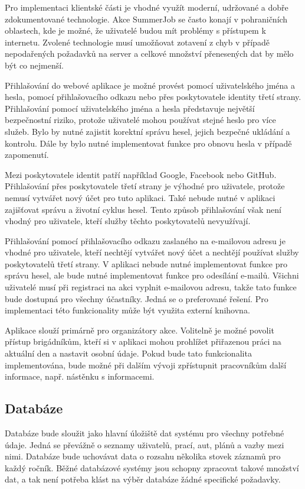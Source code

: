 Pro implementaci klientské části je vhodné využít moderní, udržované a dobře zdokumentované technologie. Akce SummerJob se často konají v pohraničních oblastech,
kde je možné, že uživatelé budou mít problémy s přístupem k internetu. Zvolené technologie musí umožňovat zotavení z chyb v případě nepodařených požadavků na server
a celkové množství přenesených dat by mělo být co nejmenší.

Přihlašování do webové aplikace je možné provést pomocí uživatelského jména a hesla, pomocí přihlašovacího odkazu nebo přes poskytovatele identity třetí strany.
Přihlašování pomocí uživatelského jména a hesla představuje největší bezpečnostní riziko, protože uživatelé mohou používat stejné heslo pro více služeb. Bylo by nutné
zajistit korektní správu hesel, jejich bezpečné ukládání a kontrolu. Dále by bylo nutné implementovat funkce pro obnovu hesla v případě zapomenutí.

Mezi poskytovatele identit patří například Google, Facebook nebo GitHub. Přihlašování přes poskytovatele třetí strany je výhodné pro uživatele, protože nemusí vytvářet
nový účet pro tuto aplikaci. Také nebude nutné v aplikaci zajišťovat správu a životní cyklus hesel. Tento způsob přihlašování však není vhodný pro uživatele,
kteří služby těchto poskytovatelů nevyužívají.

Přihlašování pomocí přihlašovacího odkazu zaslaného na e-mailovou adresu je vhodné pro uživatele, kteří nechtějí vytvářet nový účet a nechtějí používat služby poskytovatelů třetí strany.
V aplikaci nebude nutné implementovat funkce pro správu hesel, ale bude nutné implementovat funkce pro odesílání e-mailů. Všichni uživatelé musí při registraci na akci
vyplnit e-mailovou adresu, takže tato funkce bude dostupná pro všechny účastníky. Jedná se o preferované řešení. Pro implementaci této funkcionality může být využita
externí knihovna.

Aplikace slouží primárně pro organizátory akce. Volitelně je možné povolit přístup brigádníkům, kteří si v aplikaci mohou prohlížet přiřazenou práci na aktuální den a nastavit osobní údaje.
Pokud bude tato funkcionalita implementována, bude možné při dalším vývoji zpřístupnit pracovníkům další informace, např. nástěnku s informacemi.

\subsection{Databáze}

Databáze bude sloužit jako hlavní úložiště dat systému pro všechny potřebné údaje. Jedná se převážně o seznamy uživatelů, prací, aut, plánů a vazby mezi nimi.
Databáze bude uchovávat data o rozsahu několika stovek záznamů pro každý ročník. Běžné databázové systémy jsou schopny zpracovat takové množství dat, a tak není potřeba
klást na výběr databáze žádné specifické požadavky.


